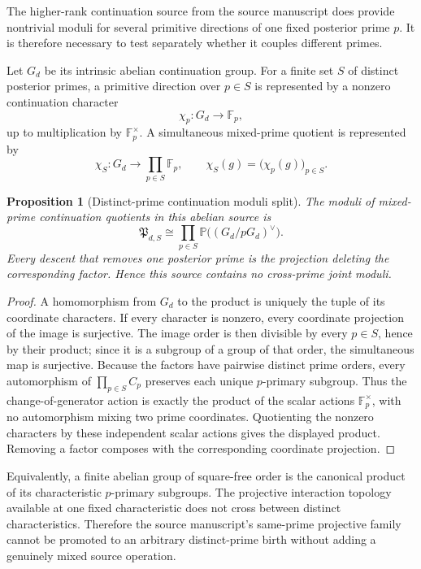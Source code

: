 \documentclass[11pt]{article}
\newtheorem{proposition}[theorem]{Proposition}
\begin{document}
The higher-rank continuation source from the source manuscript does provide
nontrivial moduli for several primitive directions of one fixed posterior
prime \(p\).  It is therefore necessary to test separately whether it couples
different primes.

Let \(G_d\) be its intrinsic abelian continuation group.  For a finite set
\(S\) of distinct posterior primes, a primitive direction over \(p\in S\) is
represented by a nonzero continuation character
\[
\chi_p:G_d\longrightarrow\mathbb F_p,
\]
up to multiplication by \(\mathbb F_p^\times\).  A simultaneous mixed-prime
quotient is represented by
\[
\chi_S:G_d\longrightarrow\prod_{p\in S}\mathbb F_p,
\qquad
\chi_S(g)=\bigl(\chi_p(g)\bigr)_{p\in S}.
\]

\begin{proposition}[Distinct-prime continuation moduli split]
\label{prop:coprime-splitting}
The moduli of mixed-prime continuation quotients in this abelian source is
\[
\boxed{
\mathfrak P_{d,S}
\cong
\prod_{p\in S}
\mathbb P\bigl((G_d/pG_d)^\vee\bigr).
}
\]
Every descent that removes one posterior prime is the projection deleting the
corresponding factor.  Hence this source contains no cross-prime joint moduli.
\end{proposition}

\begin{proof}
A homomorphism from \(G_d\) to the product is uniquely the tuple of its
coordinate characters.  If every character is nonzero, every coordinate
projection of the image is surjective.  The image order is then divisible by
every \(p\in S\), hence by their product; since it is a subgroup of a group of
that order, the simultaneous map is surjective.  Because the factors have
pairwise distinct prime orders, every automorphism of
\(\prod_{p\in S}C_p\) preserves each unique
\(p\)-primary subgroup.  Thus the change-of-generator action is exactly the
product of the scalar actions \(\mathbb F_p^\times\), with no automorphism
mixing two prime coordinates.  Quotienting the nonzero characters by these
independent scalar actions gives the displayed product.  Removing a factor
composes with the corresponding coordinate projection.
\end{proof}

Equivalently, a finite abelian group of square-free order is the canonical
product of its characteristic \(p\)-primary subgroups.  The projective
interaction topology available at one fixed characteristic does not cross
between distinct characteristics.  Therefore the source manuscript's
same-prime projective family cannot be promoted to an arbitrary distinct-prime
birth without adding a genuinely mixed source operation.
\end{document}
